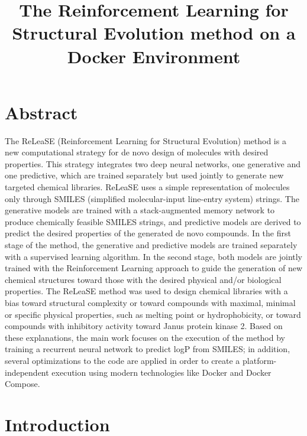 \documentclass[a4paper]{article}
\begin{document}
\title{The Reinforcement Learning for Structural Evolution method on a Docker Environment}


\author{
}
\date{} %

\maketitle

\section*{Abstract}
The ReLeaSE (Reinforcement Learning for Structural Evolution) method is a new computational strategy for de novo design of molecules with desired properties. This strategy integrates two deep neural networks, one generative and one predictive, which are trained separately but used jointly to generate new targeted chemical libraries.
ReLeaSE uses a simple representation of molecules only through SMILES (simplified molecular-input line-entry system) strings.
The generative models are trained with a stack-augmented memory network to produce chemically feasible SMILES strings, and predictive models are derived to predict the desired properties of the generated de novo compounds. In the first stage of the method, the generative and predictive models are trained separately with a supervised learning algorithm. In the second stage, both models are jointly trained with the Reinforcement Learning approach to guide the generation of new chemical structures toward those with the desired physical and/or biological properties.
The ReLeaSE method was used to design chemical libraries with a bias toward structural complexity or toward compounds with maximal, minimal or specific physical properties, such as melting point or hydrophobicity, or toward compounds with inhibitory activity toward Janus protein kinase 2.
Based on these explanations, the main work focuses on the execution of the method by training a recurrent neural network to predict logP from SMILES; in addition, several optimizations to the code are applied in order to create a platform-independent execution using modern technologies like Docker and Docker Compose.

\section{Introduction}\label{sec:intro}
\end{document}
